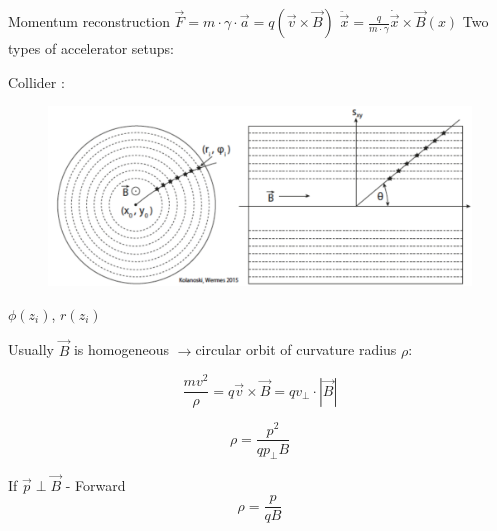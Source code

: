 \documentclass[style=husky,clock,size=9pt,dvipsnames]{powerdot}
\newcommand\ra{$\rightarrow$} %
\begin{document}
\begin{wideslide}[trans=Fly,toc=]{Momentum reconstruction}
	{\(\vec{F}=m\cdot\gamma\cdot\vec{a}=q\left(\vec{v}\times\vec{B}\right)\)}
\vspace{0.2cm}
 	{\(\ddot{\vec{x}}=\frac{q}{m\cdot\gamma}\dot{\vec{x}}\times\vec{B}(x)\)}
Two types of accelerator setups:\\
\vspace{0.5cm}
	{Collider :
		\begin{figure}
			\includegraphics[width=\textwidth]{Figures/collider}
		\end{figure}
	$\phi(z_i)$, $r(z_i)$
	}
Usually $\vec{B}$ is homogeneous \ra circular orbit of curvature radius $\rho$:
\begin{minipage}{0.4\linewidth}
	\[
		\frac{mv^2}{\rho}=q\vec{v}\times\vec{B}=qv_\perp\cdot|\vec{B}|
	\]
\end{minipage}
\begin{minipage}{0.25\linewidth}
	\[
		\rho=\frac{p^2}{qp_\perp B}
	\]
\end{minipage}
\begin{minipage}{0.25\linewidth}
	\begin{mytcolorbox}[top=-1pt,bottom=-2pt,left=2pt,right=2pt]{If $\vec{p}\perp\vec{B}$ - Forward}
		\[
			\rho=\frac{p}{qB}
		\]
	\end{mytcolorbox}
\end{minipage}

\end{wideslide}
\end{document}
